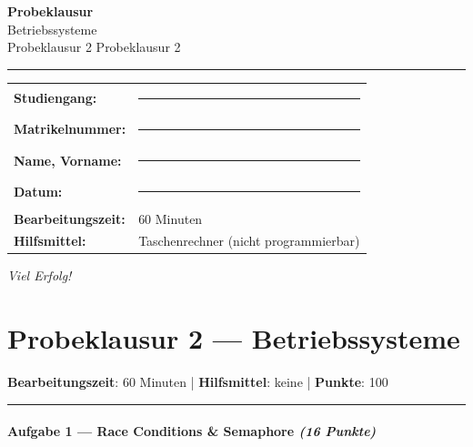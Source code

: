 \documentclass[11pt, a4paper]{article}
\providecommand{\nichttitle}{Probeklausur}
\providecommand{\nichtsubtitle}{}
\renewcommand{\nichttitle}{Betriebssysteme}
\renewcommand{\nichtsubtitle}{Probeklausur 2}
\begin{document}
\thispagestyle{empty}
\begin{center}
\vspace*{1cm}
{\Huge\bfseries\color{accent}Probeklausur}\\[8pt]
{\Large\color{accent}\nichttitle}\\[4pt]
\ifx\nichtsubtitle\empty\else
  {\large\color{accent!80!black}\nichtsubtitle}\\[6pt]
\fi
\color{accent}\rule{0.5\linewidth}{1pt}\color{black}
\end{center}

\vspace{1cm}
\begin{tabularx}{\textwidth}{@{}l X@{}}
\textbf{Studiengang:}      & \rule{6cm}{0.4pt} \\[6pt]
\textbf{Matrikelnummer:}    & \rule{6cm}{0.4pt} \\[6pt]
\textbf{Name, Vorname:}    & \rule{6cm}{0.4pt} \\[6pt]
\textbf{Datum:}             & \rule{6cm}{0.4pt} \\[6pt]
\textbf{Bearbeitungszeit:}  & 60 Minuten \\[6pt]
\textbf{Hilfsmittel:}       & Taschenrechner (nicht programmierbar) \\
\end{tabularx}

\vspace{2cm}
\begin{center}
{\large\itshape Viel Erfolg!}
\end{center}

\newpage


\section{Probeklausur 2 — Betriebssysteme}

\textbf{Bearbeitungszeit}: 60 Minuten | \textbf{Hilfsmittel}: keine | \textbf{Punkte}: 100



\noindent\textcolor{rulegray}{\rule{\linewidth}{0.4pt}}


\paragraph{Aufgabe 1 — Race Conditions \& Semaphore \textit{(16 Punkte)}}\mbox{}\\[2pt]
\end{document}
